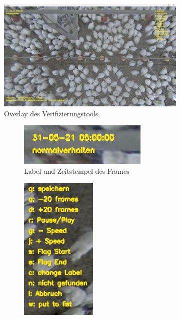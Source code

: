 \begin{figure}[hp]
     \centering
     \begin{subfigure}[b]{0.9\textwidth}
         \centering
         \includegraphics[width=\textwidth]{img/Verifikationstool/Verifikation Video mit Maske.png}
         \caption{Overlay des Verifizierungstools.}
         \label{fig:VerifOverlay}
     \end{subfigure}
     \hfill
     \begin{subfigure}[b]{0.9\textwidth}
         \begin{subfigure}[b]{0.59\textwidth}
             \centering
             \includegraphics[width=\textwidth]{img/Verifikationstool/Verifikation Video mit Maske Uhrzeit und Label.png}
             \caption{Label und Zeitstempel des Frames}
         \end{subfigure}
         \hfill
         \begin{subfigure}[b]{0.4\textwidth}
             \centering
             \includegraphics[width=\textwidth, height=7cm]{img/Verifikationstool/Verifikation Video mit Maske Bedienung.png}

\end{subfigure}
\end{subfigure}
\end{figure}
